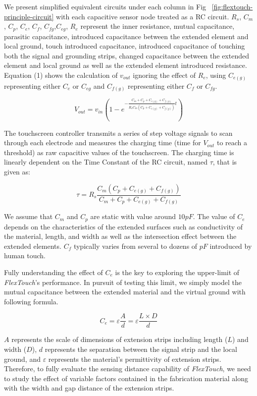 We present simplified equivalent circuits under each column in Fig ~\ref{fig:flextouch-principle-circuit} with each capacitive sensor node treated as a RC circuit. $R_{s}$, $C_{m}$, $C_{p}$, $C_{e}$, $C_{f}$, $C_{fg}$,$C_{eg}$, $R_{e}$ represent the inner resistance, mutual capacitance, parasitic capacitance, introduced capacitance between the extended element and local ground, touch introduced capacitance, introduced capacitance of touching both the signal and grounding strips, changed capacitance between the extended element and local ground as well as the extended element introduced resistance. Equation (1) shows the calculation of $v_{out}$ ignoring the effect of $R_{e}$, using $C_{e(g)}$ representing either $C_{e}$ or $C_{eg}$ and $C_{f(g)}$ representing either $C_{f}$ or $C_{fg}$.

\begin{equation}
    V_{out} = v_{in}(1-e^{-\frac{C_{m} + C_{p} + C_{e(g)} + C_{f(g)}}{R_{s}C_{m}(C_{p} + C_{e(g)} + C_{f(g)})}t})
\end{equation}


The touchscreen controller transmits a series of step voltage signals to scan through each electrode and measures the charging time (time for $V_{out}$ to reach a threshold) as raw capacitive values of the touchscreen. The charging time is linearly dependent on the Time Constant of the RC circuit, named $\tau$, that is given as:

\begin{equation}
    \tau = R_{s}\frac{C_{m}(C_{p} + C_{e(g)} + C_{f(g)})}{C_{m} + C_{p} + C_{e(g)} + C_{f(g)}}
\end{equation}

 
We assume that $C_{m}$ and $C_{p}$ are static with value around $10pF$. The value of $C_{e}$ depends on the characteristics of the extended surfaces such as conductivity of the material, length, and width as well as the intersection effect between the extended elements. $C_{f}$ typically varies from several to dozens of $pF$ introduced by human touch. 

Fully understanding the effect of $C_{e}$ is the key to exploring the upper-limit of \textit{FlexTouch}'s performance. In pursuit of testing this limit, we simply model the mutual capacitance between the extended material and the virtual ground with following formula.

\begin{equation}
    C_{e} = \varepsilon \frac{A}{d} = \varepsilon \frac{L \times D}{d}
\end{equation}

$A$ represents the scale of dimensions of extension strips including length ($L$) and width ($D$), $d$ represents the separation between the signal strip and the local ground, and $\varepsilon$ represents the material's permittivity of extension strips. Therefore, to fully evaluate the sensing distance capability of \textit{FlexTouch}, we need to study the effect of variable factors contained in the fabrication material along with the width and gap distance of the extension strips.